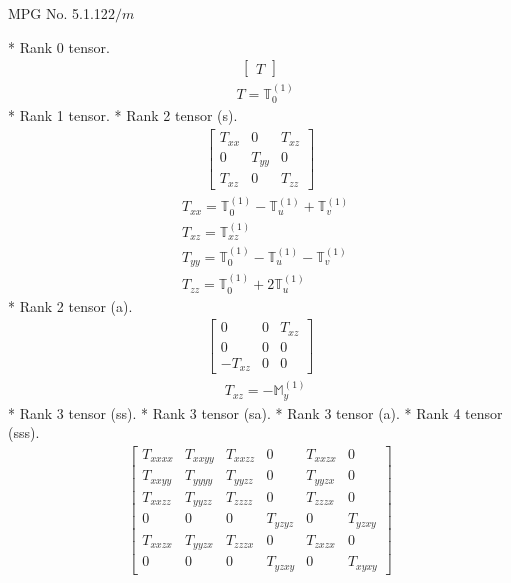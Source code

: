\documentclass[fleqn,8pt,landscape]{jsarticle}
\begin{document}
\setcounter{MaxMatrixCols}{32}

\renewcommand{\tablename}{Table~}
\renewcommand{\figurename}{Figure~}
\begin{center}
\LARGE
MPG No. 5.1.12\quad$2/m$
\end{center}
* Rank 0 tensor.
\begin{align*}
\begin{bmatrix} T \end{bmatrix}
\end{align*}
\begin{align*}
& T = \mathbb{T}_{0}^{(1)}
\end{align*}
* Rank 1 tensor.
* Rank 2 tensor (s).
\begin{align*}
\begin{bmatrix} T_{xx} & 0 & T_{xz} \\ 0 & T_{yy} & 0 \\ T_{xz} & 0 & T_{zz} \end{bmatrix}
\end{align*}
\begin{align*}
& T_{xx} = \mathbb{T}_{0}^{(1)} - \mathbb{T}_{u}^{(1)} + \mathbb{T}_{v}^{(1)} \\
& T_{xz} = \mathbb{T}_{xz}^{(1)} \\
& T_{yy} = \mathbb{T}_{0}^{(1)} - \mathbb{T}_{u}^{(1)} - \mathbb{T}_{v}^{(1)} \\
& T_{zz} = \mathbb{T}_{0}^{(1)} + 2 \mathbb{T}_{u}^{(1)}
\end{align*}
* Rank 2 tensor (a).
\begin{align*}
\begin{bmatrix} 0 & 0 & T_{xz} \\ 0 & 0 & 0 \\ - T_{xz} & 0 & 0 \end{bmatrix}
\end{align*}
\begin{align*}
& T_{xz} = - \mathbb{M}_{y}^{(1)}
\end{align*}
* Rank 3 tensor (ss).
* Rank 3 tensor (sa).
* Rank 3 tensor (a).
* Rank 4 tensor (sss).
\begin{align*}
\begin{bmatrix} T_{xxxx} & T_{xxyy} & T_{xxzz} & 0 & T_{xxzx} & 0 \\ T_{xxyy} & T_{yyyy} & T_{yyzz} & 0 & T_{yyzx} & 0 \\ T_{xxzz} & T_{yyzz} & T_{zzzz} & 0 & T_{zzzx} & 0 \\ 0 & 0 & 0 & T_{yzyz} & 0 & T_{yzxy} \\ T_{xxzx} & T_{yyzx} & T_{zzzx} & 0 & T_{zxzx} & 0 \\ 0 & 0 & 0 & T_{yzxy} & 0 & T_{xyxy} \end{bmatrix}
\end{align*}
\end{document}
